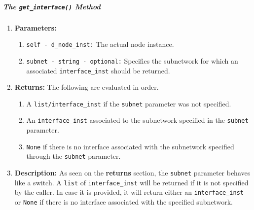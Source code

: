                     \subparagraph{The \texttt{get\_interface()} Method}
                        \begin{enumerate}
                            \item \textbf{Parameters:}
                            \begin{enumerate}
                                \item \texttt{self - d\_node\_inst:} The actual node instance.
                                \item \texttt{subnet - string - optional:} Specifies the subnetwork for which an associated \texttt{interface\_inst} should be returned.
                            \end{enumerate}
                            \item \textbf{Returns:} The following are evaluated in order.
                            \begin{enumerate}
                                \item A \texttt{list/interface\_inst} if the \texttt{subnet} parameter was not specified.
                                \item An \texttt{interface\_inst} associated to the subnetwork specified in the \texttt{subnet} parameter.
                                \item \texttt{None} if there is no interface associated with the subnetwork specified through the \texttt{subnet} parameter.
                            \end{enumerate}
                            \item \textbf{Description:} As seen on the \textbf{returns} section, the \texttt{subnet} parameter behaves like a switch. A \texttt{list} of \texttt{interface\_inst} will be returned if it is not specified by the caller. In case it is provided, it will return either an \texttt{interface\_inst} or \texttt{None} if there is no interface associated with the specified subnetwork.
                        \end{enumerate}

